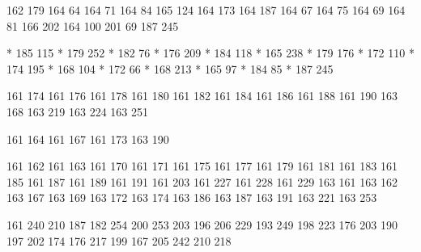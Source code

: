   162 179
  164  64
  164  71
  164  84
  165 124
  164 173
  164 187
  164  67
  164  75
  164  69
  164  81
  166 202
  164 100
  201  69
  187 245

* 185 115
* 179 252
* 182  76
* 176 209
* 184 118
* 165 238
* 179 176
* 172 110
* 174 195
* 168 104
* 172  66
* 168 213
* 165  97
* 184  85
* 187 245

\stopencoding

\startencoding[gbk]

 161 174
 161 176
 161 178
 161 180
 161 182
 161 184
 161 186
 161 188
 161 190
 163 168
 163 219
 163 224
 163 251

 161 164
 161 167
 161 173
 163 190

 161 162
 161 163
 161 170
 161 171
 161 175
 161 177
 161 179
 161 181
 161 183
 161 185
 161 187
 161 189
 161 191
 161 203
 161 227
 161 228
 161 229
 163 161
 163 162
 163 167
 163 169
 163 172
 163 174
 163 186
 163 187
 163 191
 163 221
 163 253

  161 240
  210 187
  182 254
  200 253
  203 196
  206 229
  193 249
  198 223
  176 203
  190 197
  202 174
  176 217
  199 167
  205 242
  210 218

